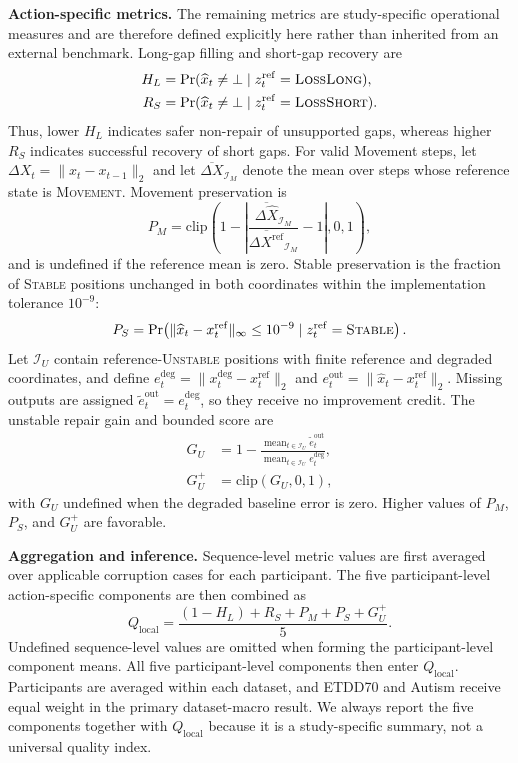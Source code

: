 \documentclass[sigconf,review]{acmart}
\begin{document}
\textbf{Action-specific metrics.} The remaining metrics are study-specific operational measures and are therefore defined explicitly here rather than inherited from an external benchmark. Long-gap filling and short-gap recovery are
\begin{align*}
H_L &= \Pr(\widehat{x}_t\neq\bot\mid z^{\mathrm{ref}}_t=\textsc{LossLong}),\\
R_S &= \Pr(\widehat{x}_t\neq\bot\mid z^{\mathrm{ref}}_t=\textsc{LossShort}).
\end{align*}
Thus, lower $H_L$ indicates safer non-repair of unsupported gaps, whereas higher $R_S$ indicates successful recovery of short gaps. For valid Movement steps, let $\Delta X_t=\lVert x_t-x_{t-1}\rVert_2$ and let $\overline{\Delta X}_{\mathcal I_M}$ denote the mean over steps whose reference state is \textsc{Movement}. Movement preservation is
\[
P_M=\mathrm{clip}\!\left(1-\left|\frac{\overline{\Delta \widehat X}_{\mathcal I_M}}{\overline{\Delta X^{\mathrm{ref}}}_{\mathcal I_M}}-1\right|,0,1\right),
\]
and is undefined if the reference mean is zero. Stable preservation is the fraction of \textsc{Stable} positions unchanged in both coordinates within the implementation tolerance $10^{-9}$:
\[
P_S=\Pr\!\left(\lVert\widehat x_t-x_t^{\mathrm{ref}}\rVert_\infty\leq10^{-9}\mid z_t^{\mathrm{ref}}=\textsc{Stable}\right).
\]
Let $\mathcal I_U$ contain reference-\textsc{Unstable} positions with finite reference and degraded coordinates, and define $e_t^{\mathrm{deg}}=\lVert x_t^{\mathrm{deg}}-x_t^{\mathrm{ref}}\rVert_2$ and $e_t^{\mathrm{out}}=\lVert\widehat x_t-x_t^{\mathrm{ref}}\rVert_2$. Missing outputs are assigned $\widetilde e_t^{\mathrm{out}}=e_t^{\mathrm{deg}}$, so they receive no improvement credit. The unstable repair gain and bounded score are
\begin{align*}
G_U &= 1-\frac{\operatorname{mean}_{t\in\mathcal I_U}\widetilde e_t^{\mathrm{out}}}{\operatorname{mean}_{t\in\mathcal I_U}e_t^{\mathrm{deg}}},\\
G_U^+ &= \mathrm{clip}(G_U,0,1),
\end{align*}
with $G_U$ undefined when the degraded baseline error is zero. Higher values of $P_M$, $P_S$, and $G_U^+$ are favorable.

\textbf{Aggregation and inference.}
Sequence-level metric values are first averaged over applicable
corruption cases for each participant. The five participant-level
action-specific components are then combined as
\begin{equation}
Q_{\mathrm{local}}
=
\frac{(1-H_L)+R_S+P_M+P_S+G_U^+}{5}.
\label{eq:local_action}
\end{equation}
Undefined sequence-level values are omitted when forming the
participant-level component means. All five participant-level components
then enter $Q_{\mathrm{local}}$. Participants are averaged within each
dataset, and ETDD70 and Autism receive equal weight in the primary
dataset-macro result. We always report the five components together with
$Q_{\mathrm{local}}$ because it is a study-specific summary, not a
universal quality index.
\end{document}
